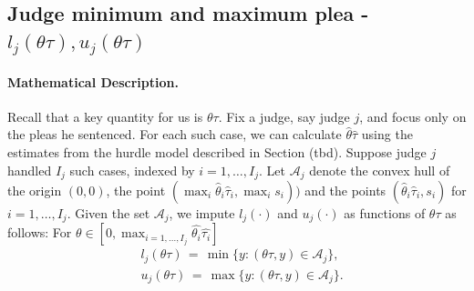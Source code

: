 \documentclass[11pt, oneside]{article}   	%
\theoremstyle{ModifiedStyle}
\begin{document}
  \subsection{Judge minimum and maximum plea - $l_j(\theta \tau),u_j(\theta \tau)$}\label{convex_hull-estimation}
    \paragraph{Mathematical Description.} Recall that a key quantity for us is $\theta\tau$. Fix a judge, say judge $j$, and focus only on the pleas he sentenced. For each such case, we can calculate $\hat{\theta}\hat{\tau}$ using the estimates from the hurdle model described in Section (tbd). Suppose judge $j$ handled $I_j$ such cases, indexed by $i=1,\ldots,I_j$. Let $\mathcal{A}_j$ denote the convex hull of the origin $(0,0)$, the point $(\max_i \hat{\theta}_i \hat{\tau}_i, \max_i s_i))$ and the points $(\hat{\theta}_i\hat{\tau}_i,s_i)$ for $i=1,\ldots,I_j$. Given the set $\mathcal{A}_j$, we impute $l_j(\cdot)$ and $u_j(\cdot)$ as functions of $\theta\tau$ as follows: For $\theta \in [0,\max_{i=1,...,I_j} \hat{\theta_i}\hat{\tau_i}]$
		\begin{align*}
			&l_j(\theta\tau) \,=\, \min\{y:(\theta\tau,y)\in\mathcal{A}_j \}, \\
			&u_j(\theta\tau) \,=\, \max\{y:(\theta\tau,y)\in\mathcal{A}_j \}.
		\end{align*}

\end{document}
